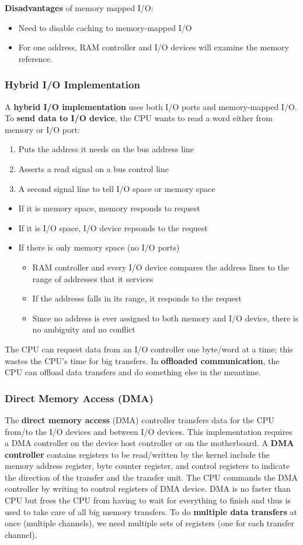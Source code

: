 \documentclass{article}
\newcommand{\bold}[1]{\textbf{#1}}
\renewcommand{\b}{\item[$\circ$]}
\newcommand{\newlist}{\begin{itemize}}
\renewcommand{\endlist}{\end{itemize}}
\begin{document}
\bold{Disadvantages} of memory mapped I/O:

\newlist
\b Need to disable caching to memory-mapped I/O
\b For one address, RAM controller and I/O devices will examine the memory reference. 
\endlist

\subsubsection{Hybrid I/O Implementation}

A \bold{hybrid I/O implementation} uses both I/O ports and memory-mapped I/O. To \bold{send data to I/O device}, the CPU wants to read a word either from memory or I/O port:

\begin{enumerate}
    \item Puts the address it needs on the bus address line
    \item Asserts a read signal on a bus control line
    \item A second signal line to tell I/O space or memory space
\end{enumerate}

\newlist 
\b If it is memory space, memory responds to request
\b If it is I/O space, I/O device repsonds to the request
\b If there is only memory space (no I/O ports)
\newlist 
\b RAM controller and every I/O device compares the address lines to the range of addresses that it services
\b If the addresss falls in its range, it responds to the request
\b Since no address is ever assigned to both memory and I/O device, there is no ambiguity and no conflict
\endlist 
\endlist 

The CPU can request data from an I/O controller one byte/word at a time; this wastes the CPU's time for big transfers. In \bold{offloaded communication}, the CPU can offload data transfers and do something else in the meantime. 

\subsubsection{Direct Memory Access (DMA)}

The \bold{direct memory access} (DMA) controller transfers data for the CPU from/to the I/O devices and between I/O devices. This implementation requires a DMA controller on the device host controller or on the motherboard. A \bold{DMA controller} contains registers to be read/written by the kernel include the memory address register, byte counter register, and control registers to indicate the direction of the transfer and the transfer unit. The CPU commands the DMA controller by writing to control registers of DMA device. DMA is no faster than CPU but frees the CPU from having to wait for everything to finish and thus is used to take care of all big memory transfers. To do \bold{multiple data transfers} at once (multiple channels), we need multiple sets of registers (one for each transfer channel). 
\end{document}
